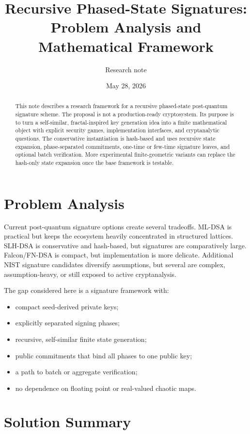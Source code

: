 \documentclass[11pt]{article}
\title{Recursive Phased-State Signatures:\\Problem Analysis and Mathematical Framework}
\author{Research note}
\date{May 28, 2026}
\begin{document}
\maketitle

\begin{abstract}
This note describes a research framework for a recursive phased-state
post-quantum signature scheme. The proposal is not a production-ready
cryptosystem. Its purpose is to turn a self-similar, fractal-inspired key
generation idea into a finite mathematical object with explicit security
games, implementation interfaces, and cryptanalytic questions. The conservative
instantiation is hash-based and uses recursive state expansion, phase-separated
commitments, one-time or few-time signature leaves, and optional batch
verification. More experimental finite-geometric variants can replace the
hash-only state expansion once the base framework is testable.
\end{abstract}

\section{Problem Analysis}

Current post-quantum signature options create several tradeoffs. ML-DSA is
practical but keeps the ecosystem heavily concentrated in structured lattices.
SLH-DSA is conservative and hash-based, but signatures are comparatively large.
Falcon/FN-DSA is compact, but implementation is more delicate. Additional NIST
signature candidates diversify assumptions, but several are complex,
assumption-heavy, or still exposed to active cryptanalysis.

The gap considered here is a signature framework with:
\begin{itemize}
  \item compact seed-derived private keys;
  \item explicitly separated signing phases;
  \item recursive, self-similar finite state generation;
  \item public commitments that bind all phases to one public key;
  \item a path to batch or aggregate verification;
  \item no dependence on floating point or real-valued chaotic maps.
\end{itemize}

\section{Solution Summary}
\end{document}
